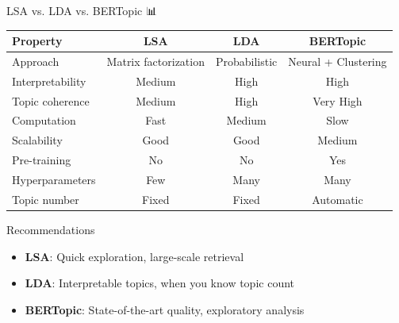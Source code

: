 \documentclass[aspectratio=169]{beamer}
\begin{document}
\begin{frame}{LSA vs. LDA vs. BERTopic 📊}
\begin{center}
\begin{tabular}{lccc}
\toprule
\textbf{Property} & \textbf{LSA} & \textbf{LDA} & \textbf{BERTopic} \\
\midrule
Approach & Matrix factorization & Probabilistic & Neural + Clustering \\
Interpretability & Medium & High & High \\
Topic coherence & Medium & High & Very High \\
Computation & Fast & Medium & Slow \\
Scalability & Good & Good & Medium \\
Pre-training & No & No & Yes \\
Hyperparameters & Few & Many & Many \\
Topic number & Fixed & Fixed & Automatic \\
\bottomrule
\end{tabular}
\end{center}

\vspace{1em}

\begin{block}{Recommendations}
\begin{itemize}\setlength{\itemsep}{0pt}
    \item \textbf{LSA}: Quick exploration, large-scale retrieval
    \item \textbf{LDA}: Interpretable topics, when you know topic count
    \item \textbf{BERTopic}: State-of-the-art quality, exploratory analysis
\end{itemize}
\end{block}
\end{frame}
\end{document}
